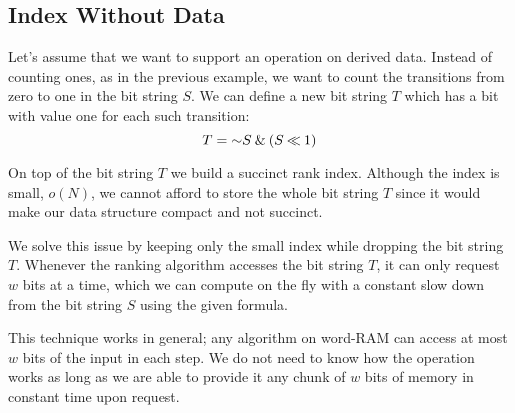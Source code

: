 \subsection{\label{ss:index-without-data}Index Without Data}

Let's assume that we want to support an operation on derived data.
Instead of counting ones, as in the previous example, we want to count the transitions from zero to one in the bit string $S$.
We can define a new bit string $T$ which has a bit with value one for each such transition:
$$ T = \mathord{\sim} S \mathbin{\&} (S \mathbin{\ll} 1)$$

On top of the bit string $T$ we build a succinct rank index.
Although the index is small, $o(N)$, we cannot afford to store the whole bit string $T$ since it would make our data structure compact and not succinct.

We solve this issue by keeping only the small index while dropping the bit string $T$.
Whenever the ranking algorithm accesses the bit string $T$, it can only request $w$ bits at a time, which we can compute on the fly with a constant slow down from the bit string $S$ using the given formula.

This technique works in general; any algorithm on word-RAM can access at most $w$ bits of the input in each step.
We do not need to know how the operation works as long as we are able to provide it any chunk of $w$ bits of memory in constant time upon request.
